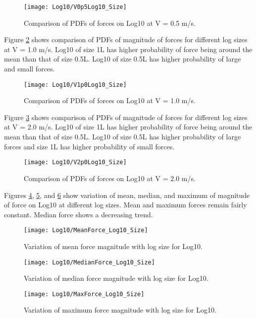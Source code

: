 \begin{figure}
\centering
\texttt{[image: Log10/V0p5Log10\_Size]}
\caption{\label{fig:V0p5Log10_Size}Comparison of PDFs of forces on Log10 at V = 0.5 m/s.}
\end{figure}

\noindent Figure \ref{fig:V1p0Log10_Size} shows comparison of PDFs of magnitude of forces for different log sizes at V = 1.0 m/s. Log10 of size 1L has higher probability of force being around the mean than that of size 0.5L. Log10 of size 0.5L has higher probability of large and small forces.

\begin{figure}
\centering
\texttt{[image: Log10/V1p0Log10\_Size]}
\caption{\label{fig:V1p0Log10_Size}Comparison of PDFs of forces on Log10 at V = 1.0 m/s.}
\end{figure}

\noindent Figure \ref{fig:V2p0Log10_Size} shows comparison of PDFs of magnitude of forces for different log sizes at V = 2.0 m/s. Log10 of size 1L has higher probability of force being around the mean than that of size 0.5L. Log10 of size 0.5L has higher probability of large forces and size 1L has higher probability of small forces.

\begin{figure}
\centering
\texttt{[image: Log10/V2p0Log10\_Size]}
\caption{\label{fig:V2p0Log10_Size}Comparison of PDFs of forces on Log10 at V = 2.0 m/s.}
\end{figure}

\noindent Figures \ref{fig:MeanForce_Log10_Size}, \ref{fig:MedianForce_Log10_Size}, and \ref{fig:MaxForce_Log10_Size} show variation of mean, median, and maximum of magnitude of force on Log10 at different log sizes. Mean and maximum forces remain fairly constant. Median force shows a decreasing trend.

\begin{figure}
\centering
\texttt{[image: Log10/MeanForce\_Log10\_Size]}
\caption{\label{fig:MeanForce_Log10_Size}Variation of mean force magnitude with log size for Log10.}
\end{figure}
\begin{figure}
\centering
\texttt{[image: Log10/MedianForce\_Log10\_Size]}
\caption{\label{fig:MedianForce_Log10_Size}Variation of median force magnitude with log size for Log10.}
\end{figure}
\begin{figure}
\centering
\texttt{[image: Log10/MaxForce\_Log10\_Size]}
\caption{\label{fig:MaxForce_Log10_Size}Variation of maximum force magnitude with log size for Log10.}
\end{figure}


